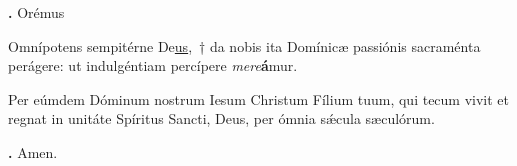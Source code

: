 \textbf{\Vbar.} Orémus

Omnípotens sempitérne De\underline{us},~† da nobis ita Domínicæ passiónis sacraménta perágere: ut indulgéntiam percípere \textit{mere}\textbf{á}mur.

Per eúmdem Dóminum nostrum Iesum Christum Fílium tuum, qui tecum vivit et regnat in unitáte Spíritus Sancti, Deus, per ómnia s\'{\ae}cula sæculórum.

\textbf{\Rbar.} Amen.

